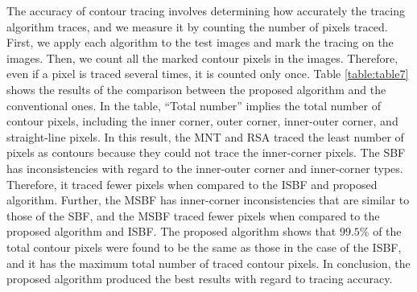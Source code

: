 


The accuracy of contour tracing involves determining how accurately the tracing algorithm traces, and we measure it by counting the number of pixels traced. First, we apply each algorithm to the test images and mark the tracing on the images. Then, we count all the marked contour pixels in the images. Therefore, even if a pixel is traced several times, it is counted only once. Table \ref{table:table7}  shows the results of the comparison between the proposed algorithm and the conventional ones. In the table, ``Total number'' implies the total number of contour pixels, including the inner corner, outer corner, inner-outer corner, and straight-line pixels. In this result, the MNT and RSA traced the least number of pixels as contours because they could not trace the inner-corner pixels. The SBF has inconsistencies with regard to the inner-outer corner and inner-corner types. Therefore, it traced fewer pixels when compared to the ISBF and proposed algorithm. Further, the MSBF has inner-corner inconsistencies that are similar to those of the SBF, and the MSBF traced fewer pixels when compared to the proposed algorithm and ISBF. The proposed algorithm shows that $99.5\%$ of the total contour pixels were found to be the same as those in the case of the ISBF, and it has the maximum total number of traced contour pixels. In conclusion, the proposed algorithm produced the best results with regard to tracing accuracy.

